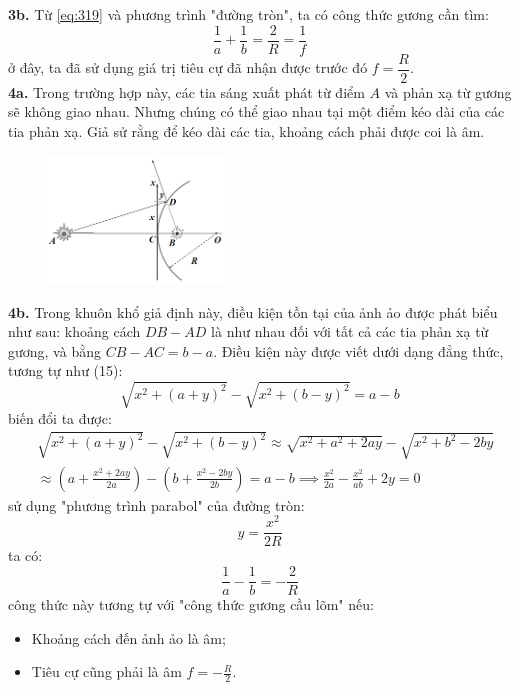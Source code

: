 \noindent\textbf{3b.} Từ \eqref{eq:319} và phương trình "đường tròn", ta có công thức gương cần tìm:
\begin{equation}
  \frac{1}{a}+\frac{1}{b}=\frac{2}{R}=\frac{1}{f}
\end{equation}
ở đây, ta đã sử dụng giá trị tiêu cự đã nhận được trước đó $ f = \dfrac{R}{2} $.\\

\noindent\textbf{4a.} Trong trường hợp này, các tia sáng xuất phát từ điểm $A$ và phản xạ từ gương sẽ không giao nhau. Nhưng chúng có thể giao nhau tại một điểm kéo dài của các tia phản xạ. Giả sử rằng để kéo dài các tia, khoảng cách phải được coi là âm. \\

\begin{figure}
  \centering
  \vspace{-8mm}
  \includegraphics[width=0.42\textwidth]{Figures/P3/Fig 3.4S.png}
\end{figure}

\noindent\textbf{4b.} Trong khuôn khổ giả định này, điều kiện tồn tại của ảnh ảo được phát biểu như sau: khoảng cách $DB-AD$ là như nhau đối với tất cả các tia phản xạ từ gương, và bằng $CB-AC=b-a$. Điều kiện này được viết dưới dạng đẳng thức, tương tự như (15):
\setcounter{equation}{19}
\begin{equation}
  \label{eq:320}
  \sqrt{x^{2}+(a+y)^{2}}-\sqrt{x^{2}+(b-y)^{2}}=a-b
\end{equation}
biến đổi ta được:
\begin{align}
  \label{eq:321}
   & \sqrt{x^{2}+(a+y)^{2}}-\sqrt{x^{2}+(b-y)^{2}}\approx\sqrt{x^{2}+a^{2}+2ay}-\sqrt{x^{2}+b^{2}-2by}                                 \\
   & \approx \left(a+\frac{x^{2}+2ay}{2a}\right)-\left(b+\frac{x^{2}-2by}{2b}\right)=a-b\implies\frac{x^{2}}{2a}-\frac{x^{2}}{ab}+2y=0
\end{align}
sử dụng "phương trình parabol" của đường tròn:
\begin{equation*}
  y=\frac{x^{2}}{2R}
\end{equation*}
ta có:
\begin{equation}
  \label{eq:322}
  \frac{1}{a}-\frac{1}{b}=-\frac{2}{R}
\end{equation}
công thức này tương tự với "công thức gương cầu lõm" nếu:
\begin{itemize}
  \item Khoảng cách đến ảnh ảo là âm;
  \item Tiêu cự cũng phải là âm $f=-\frac{R}{2}$.
\end{itemize}

